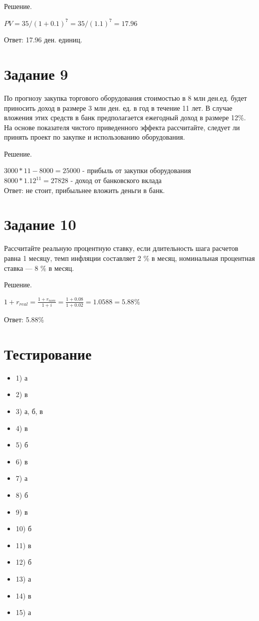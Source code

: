 \documentclass[14pt,a4paper]{extarticle}
\begin{document}
Решение.

$PV = 35 / (1 + 0.1)^7 = 35 / (1.1)^7 = 17.96$

Ответ: 17.96 ден. единиц.

\section{Задание 9}
По прогнозу закупка торгового оборудования стоимостью в 8 млн ден.ед. будет
приносить доход в размере 3 млн ден. ед. в год в течение 11 лет. В случае вложения этих
средств в банк предполагается ежегодный доход в размере 12\%.
На основе показателя чистого приведенного эффекта рассчитайте, следует ли
принять проект по закупке и использованию оборудования.

Решение.

$3000 * 11 - 8000 = 25 000$ - прибыль от закупки оборудования \\
$ 8000 * 1.12^{ 11 } = 27828 $ - доход от банковского вклада \\

Ответ: не стоит, прибыльнее вложить деньги в банк.

\section{Задание 10}
Рассчитайте реальную процентную ставку, если длительность шага расчетов равна 1
месяцу, темп инфляции составляет 2 \% в месяц, номинальная процентная ставка — 8 \% в
месяц.

Решение.

$1 + r_{real} = \frac{ 1 + r_{nom} } { 1 + i } = \frac{1 + 0.08}{1+0.02} = 1.0588 = 5.88\%$

Ответ: 5.88\%

\section{Тестирование}
\begin{itemize}
\item 1) а
\item 2) в
\item 3) а, б, в
\item 4) в
\item 5) б
\item 6) в
\item 7) а
\item 8) б
\item 9) в
\item 10) б
\item 11) в
\item 12) б
\item 13) а
\item 14) в
\item 15) а
\end{itemize}
\end{document}
